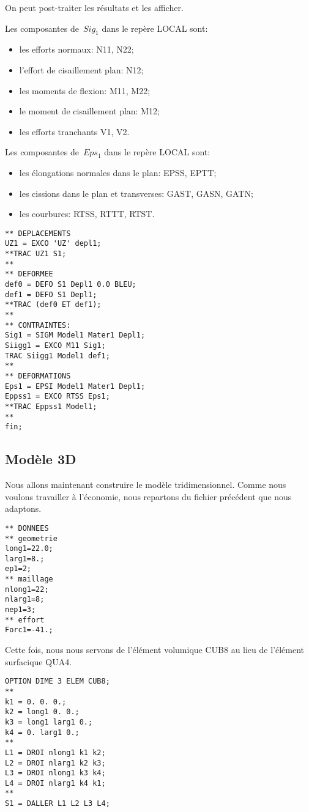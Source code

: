 On peut post-traiter les résultats et les afficher.

Les composantes de~$Sig_1$ dans le repère LOCAL sont:
\begin{itemize}
  \item les efforts normaux: N11, N22;
  \item l'effort de cisaillement plan: N12; 
  \item les moments de flexion: M11, M22;
  \item le moment de cisaillement plan: M12;
  \item les efforts tranchants V1, V2.
\end{itemize}

Les composantes de~$Eps_1$ dans le repère LOCAL sont:
\begin{itemize}
  \item les élongations normales dans le plan: EPSS, EPTT;
  \item les cissions dans le plan et transverses: GAST, GASN, GATN;
  \item les courbures: RTSS, RTTT, RTST.
\end{itemize}
\begin{lstlisting}[firstnumber=last]
** DEPLACEMENTS
UZ1 = EXCO 'UZ' depl1;
**TRAC UZ1 S1;
**
** DEFORMEE
def0 = DEFO S1 Depl1 0.0 BLEU;
def1 = DEFO S1 Depl1;
**TRAC (def0 ET def1);
**
** CONTRAINTES: 
Sig1 = SIGM Model1 Mater1 Depl1;
Siigg1 = EXCO M11 Sig1;
TRAC Siigg1 Model1 def1;
**
** DEFORMATIONS
Eps1 = EPSI Model1 Mater1 Depl1;
Eppss1 = EXCO RTSS Eps1;
**TRAC Eppss1 Model1;
**
fin;
\end{lstlisting}

\medskip
\subsection{Modèle 3D}

Nous allons maintenant construire le modèle tridimensionnel. Comme nous voulons travailler à l'économie, nous repartons du fichier précédent que nous adaptons.
\begin{lstlisting}[firstnumber=1]
** DONNEES
** geometrie
long1=22.0;
larg1=8.;
ep1=2;
** maillage
nlong1=22;
nlarg1=8;
nep1=3;
** effort
Forc1=-41.;
\end{lstlisting}

Cette fois, nous nous servons de l'élément volumique CUB8 au lieu de l'élément surfacique QUA4.
\begin{lstlisting}[firstnumber=last]
OPTION DIME 3 ELEM CUB8;
**
k1 = 0. 0. 0.;
k2 = long1 0. 0.;
k3 = long1 larg1 0.;
k4 = 0. larg1 0.;
**
L1 = DROI nlong1 k1 k2;
L2 = DROI nlarg1 k2 k3;
L3 = DROI nlong1 k3 k4;
L4 = DROI nlarg1 k4 k1;
**
S1 = DALLER L1 L2 L3 L4;
\end{lstlisting}


